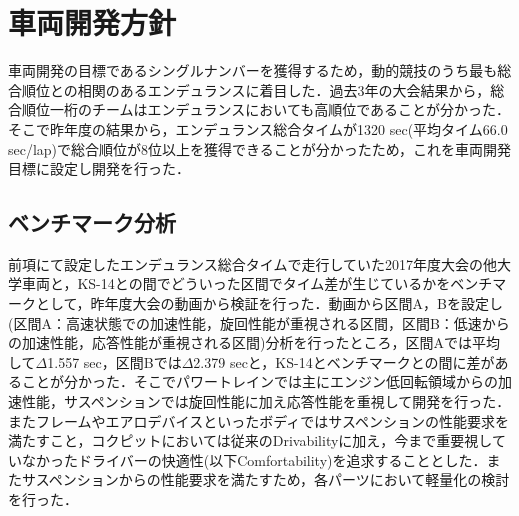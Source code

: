 \section{車両開発方針}
車両開発の目標であるシングルナンバーを獲得するため，動的競技のうち最も総合順位との相関のあるエンデュランスに着目した．過去3年の大会結果から，総合順位一桁のチームはエンデュランスにおいても高順位であることが分かった．そこで昨年度の結果から，エンデュランス総合タイムが1320 sec(平均タイム66.0 sec/lap)で総合順位が8位以上を獲得できることが分かったため，これを車両開発目標に設定し開発を行った．

\subsection{ベンチマーク分析}
前項にて設定したエンデュランス総合タイムで走行していた2017年度大会の他大学車両と，KS-14との間でどういった区間でタイム差が生じているかをベンチマークとして，昨年度大会の動画から検証を行った．動画から区間A，Bを設定し(区間A：高速状態での加速性能，旋回性能が重視される区間，区間B：低速からの加速性能，応答性能が重視される区間)分析を行ったところ，区間Aでは平均して$\Delta$1.557 sec，区間Bでは$\Delta$2.379 secと，KS-14とベンチマークとの間に差があることが分かった．そこでパワートレインでは主にエンジン低回転領域からの加速性能，サスペンションでは旋回性能に加え応答性能を重視して開発を行った．またフレームやエアロデバイスといったボディではサスペンションの性能要求を満たすこと，コクピットにおいては従来のDrivabilityに加え，今まで重要視していなかったドライバーの快適性(以下Comfortability)を追求することとした．またサスペンションからの性能要求を満たすため，各パーツにおいて軽量化の検討を行った．
